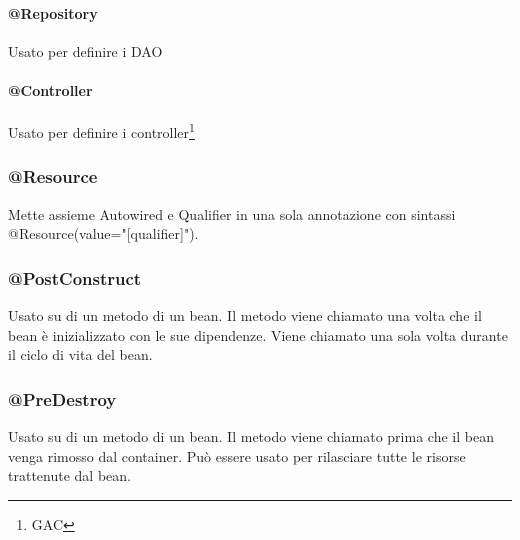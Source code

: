 \documentclass[11pt,a4paper]{book}
\begin{document}
\paragraph{@Repository}
Usato per definire i DAO
\paragraph{@Controller}
Usato per definire i controller\footnote{GAC}

\subsubsection{@Resource}
Mette assieme Autowired e Qualifier in una sola annotazione con sintassi @Resource(value="[qualifier]").

\subsubsection{@PostConstruct}
Usato su di un metodo di un bean. Il metodo viene chiamato una volta che il bean è inizializzato con le sue dipendenze. Viene chiamato una sola volta durante il ciclo di vita del bean.

\subsubsection{@PreDestroy}
Usato su di un metodo di un bean. Il metodo viene chiamato prima che il bean venga rimosso dal container. Può essere usato per rilasciare tutte le risorse trattenute dal bean.
\end{document}

